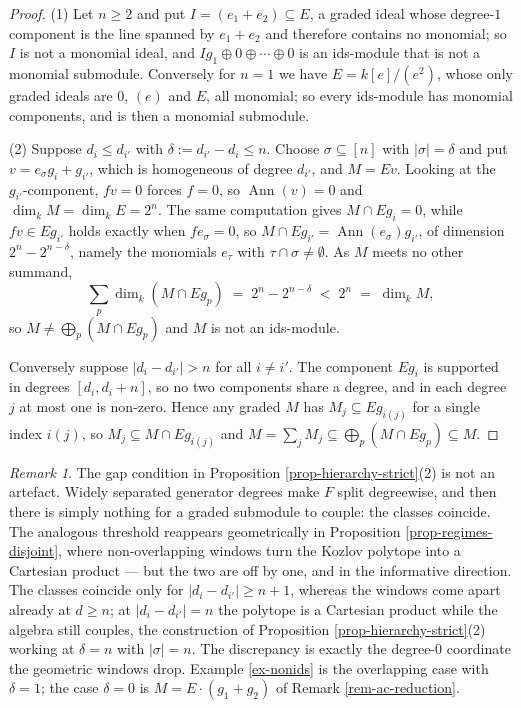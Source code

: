\documentclass[11pt, a4paper, abstract=yes]{scrartcl}
\theoremstyle{definition}
\theoremstyle{remark}
\newtheorem{remark}[definition]{Remark}
\theoremstyle{plain}
\begin{document}
\begin{proof}
(1) Let \(n\ge2\) and put \(I=(e_1+e_2)\subseteq E\), a graded ideal whose degree-\(1\) component is
the line spanned by \(e_1+e_2\) and therefore contains no monomial; so \(I\) is not a monomial ideal,
and \(Ig_1\oplus0\oplus\cdots\oplus0\) is an ids-module that is not a monomial submodule. Conversely
for \(n=1\) we have \(E=k[e]/(e^2)\), whose only graded ideals are \(0\), \((e)\) and \(E\), all
monomial;
so every ids-module has monomial components, and is then a monomial submodule.

(2) Suppose \(d_i\le d_{i'}\) with \(\delta:=d_{i'}-d_i\le n\). Choose \(\sigma\subseteq[n]\) with
\(\lvert\sigma\rvert=\delta\) and put \(v=e_\sigma g_i+g_{i'}\), which is homogeneous of degree
\(d_{i'}\), and \(M=Ev\). Looking at the \(g_{i'}\)-component, \(fv=0\) forces \(f=0\), so
\(\operatorname{Ann}(v)=0\) and \(\dim_kM=\dim_kE=2^n\). The same computation gives
\(M\cap Eg_i=0\), while \(fv\in Eg_{i'}\) holds exactly when \(fe_\sigma=0\), so
\(M\cap Eg_{i'}=\operatorname{Ann}(e_\sigma)g_{i'}\), of dimension \(2^n-2^{n-\delta}\), namely the
monomials \(e_\tau\) with \(\tau\cap\sigma\ne\emptyset\). As \(M\) meets no other summand,
\begin{equation}\label{eq:hierarchy-strict}
  \sum_{p}\dim_k(M\cap Eg_p)\;=\;2^n-2^{n-\delta}\;<\;2^n\;=\;\dim_kM ,
\end{equation}
so \(M\ne\bigoplus_p(M\cap Eg_p)\) and \(M\) is not an ids-module.

Conversely suppose \(\lvert d_i-d_{i'}\rvert>n\) for all \(i\ne i'\). The component \(Eg_i\) is
supported in degrees \([d_i,d_i+n]\), so no two components share a degree, and in each degree \(j\)
at most one is non-zero. Hence any graded \(M\) has \(M_j\subseteq Eg_{i(j)}\) for a single index
\(i(j)\), so \(M_j\subseteq M\cap Eg_{i(j)}\) and \(M=\sum_jM_j\subseteq\bigoplus_p(M\cap Eg_p)\subseteq M\).
\end{proof}

\begin{remark}
The gap condition in Proposition \ref{prop-hierarchy-strict}(2) is not an artefact. Widely separated
generator degrees make \(F\) split degreewise, and then there is simply nothing for a graded
submodule to couple: the classes coincide. The analogous threshold
reappears geometrically in Proposition \ref{prop-regimes-disjoint}, where non-overlapping windows turn
the Kozlov polytope into a Cartesian product --- but the two are off by one, and in the informative
direction. The classes coincide only for \(\lvert d_i-d_{i'}\rvert\ge n+1\), whereas the windows come
apart already at \(d\ge n\); at \(\lvert d_i-d_{i'}\rvert=n\) the polytope is a Cartesian product
while the algebra still couples, the construction of
Proposition \ref{prop-hierarchy-strict}(2) working at \(\delta=n\) with \(\lvert\sigma\rvert=n\). The
discrepancy is exactly the degree-\(0\) coordinate the geometric windows drop. Example \ref{ex-nonids} is the overlapping case with
\(\delta=1\); the case \(\delta=0\) is \(M=E\cdot(g_1+g_2)\) of Remark \ref{rem-ac-reduction}.
\label{rem-hierarchy-gaps}
\end{remark}
\end{document}

